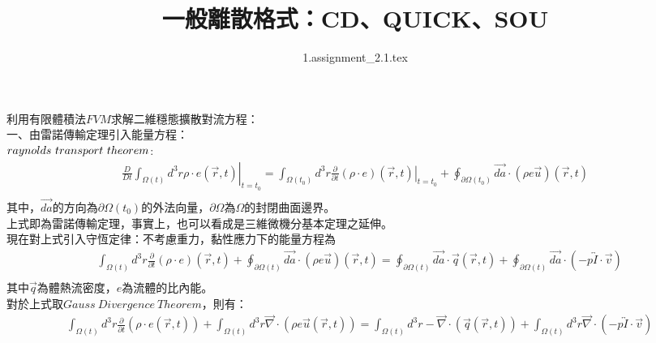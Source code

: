 \documentclass[12pt]{article}
\title{一般離散格式：CD、QUICK、SOU}
\author{1.assignment\_2.1.tex}
\begin{document}
 
\maketitle 
\noindent 利用有限體積法$FVM$求解二維穩態擴散對流方程：\\
一、由雷諾傳輸定理引入能量方程：\\
$raynolds\ transport \ theorem\\$:
\begin{equation}
\begin{split}
\left. \frac{D}{Dt} \int_{\Omega(t)} d^{3} r \rho \cdot e (\vec{r} , t)\right |_{t = t_0} = \int_{\Omega{(t_0)}} d^{3} r \left.\frac{\partial}{\partial t}( \rho \cdot e )(\vec{r} , t)\right|_{t = t_0} + \oint_{\partial \Omega{(t_0)}} \vec{da} \cdot (\rho e \vec{u})(\vec{r} , t)\\
\end{split}
\end{equation}
\noindent 其中，$\vec{da}$的方向為$\partial \Omega{(t_0)}$的外法向量，$\partial\Omega$為$\Omega$的封閉曲面邊界。\\
\noindent 上式即為雷諾傳輸定理，事實上，也可以看成是三維微機分基本定理之延伸。\\
現在對上式引入守恆定律：不考慮重力，黏性應力下的能量方程為
\begin{equation}
\begin{split}
  &\int_{\Omega{(t)}} d^{3} r \frac{\partial}{\partial t}( \rho \cdot e ) (\vec{r} , t)+ \oint_{\partial \Omega{(t)}} \vec{da} \cdot (\rho e \vec{u})(\vec{r} , t)
  =\oint_{\partial \Omega{(t)}} \vec{da} \cdot \vec{q} (\vec{r} , t) + \oint_{\partial \Omega{(t)}}  \vec{da} \cdot (-p \overleftrightarrow{I} \cdot \vec{v})  \\
\end{split}
\end{equation}
\noindent 其中$\vec{q}$為體熱流密度，$e$為流體的比內能。\\
\noindent 對於上式取$Gauss\ Divergence\ Theorem$，則有：
\begin{equation}
\begin{split}
  &\int_{\Omega{(t)}} d^{3} r \frac{\partial}{\partial t}( \rho \cdot e (\vec{r} , t)) + \int_{\Omega{(t)}} d^{3} r \vec{\nabla} \cdot (\rho e \vec{u}(\vec{r} , t)) =\int_{\Omega{(t)}} d^{3} r -\vec{\nabla} \cdot (\vec{q} (\vec{r} , t))+ \int_{\Omega{(t)}}  d^{3} r \vec{\nabla}\cdot (-p \overleftrightarrow{I} \cdot \vec{v})   \\
\end{split}
\end{equation}
\end{document}
